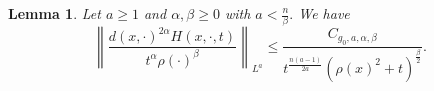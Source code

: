\documentclass[12pt]{amsart}
\renewcommand{\1}{{\mathbf 1}}
\newtheorem{lemma}[thm]{Lemma}
\theoremstyle{others}
\numberwithin{equation}{section}
\begin{document}






\begin{lemma}\label{lemma:heatkernelLpests}
    Let $a \geq 1$ and $\alpha, \beta \geq 0$ with $a < \frac{n}{\beta}.$ %
    We have
        \begin{equation}\label{HLarhobnorm}
        \left\|  \frac{d(x,\cdot)^{2\alpha} H(x,\cdot, t) }{t^\alpha \rho(\cdot)^\beta} \right\|_{L^{a}} \leq \frac{C_{g_0,a,\alpha, \beta} }{t^{\frac{n(a - 1)}{2a}} \left( \rho(x)^{2} + t \right)^{\frac{\beta}{2}} }.
        \end{equation}

\end{lemma}
\end{document}

